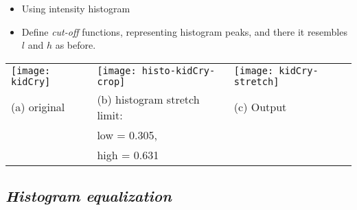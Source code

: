 \documentclass{response}
\begin{document}
\newpage
\bigskip
\bigskip
\vspace{1cm}

{\large 


\begin{itemize}\setlength\itemsep{-0.5em}
\item Using intensity histogram
\item Define \textit{cut-off} functions, representing histogram peaks, and there it resembles $l$ and $h$ as before.

\end{itemize}
\bigskip
\bigskip


\begin{tabular}{lll}
\texttt{[image: kidCry]} & \texttt{[image: histo-kidCry-crop]} &
\texttt{[image: kidCry-stretch]} \\
(a) original & (b) histogram stretch limit:  & (c) Output\\
& low = 0.305, & \\
& high = 0.631 
\end{tabular}

}



\newpage

\subsection*{\Huge\em Histogram  equalization}
\bigskip
\end{document}
